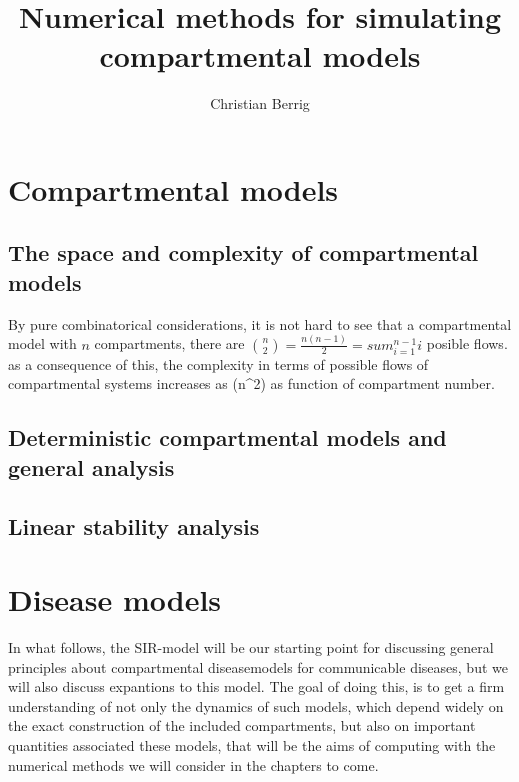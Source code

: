 \documentclass{article}
\author{Christian Berrig}
\title{Numerical methods for simulating compartmental models}
\begin{document}

\maketitle



\section{Compartmental models} \label{sec:rev_proj1}

\subsection{The space and complexity of compartmental models}
By pure combinatorical considerations, it is not hard to see that a compartmental model with $n$ compartments, there are $\binom{n}{2} = \frac{n(n-1)}{2} = sum_{i=1}^{n-1} i$ posible flows. 
as a consequence of this, the complexity in terms of possible flows of compartmental systems increases as \bigo (n^{2}) as function of compartment number. 

\subsection{Deterministic compartmental models and general analysis}

\subsection{Linear stability analysis}

\section{Disease models}
In what follows, the SIR-model will be our starting point for discussing general principles about compartmental diseasemodels for communicable diseases, but we will also discuss expantions to this model. The goal of doing this, is to get a firm understanding of not only the dynamics of such models, which depend widely on the exact construction of the included compartments, but also on important quantities associated these models, that will be the aims of computing with the numerical methods we will consider in the chapters to come.
\end{document}
